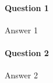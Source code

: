 \documentclass{ds-report}
\begin{document}
	\maketitle

	\paragraph{Question 1} 
	Answer 1
	
	\paragraph{Question 2} 
	Answer 2
	
	\clearpage
	
	
\end{document}
